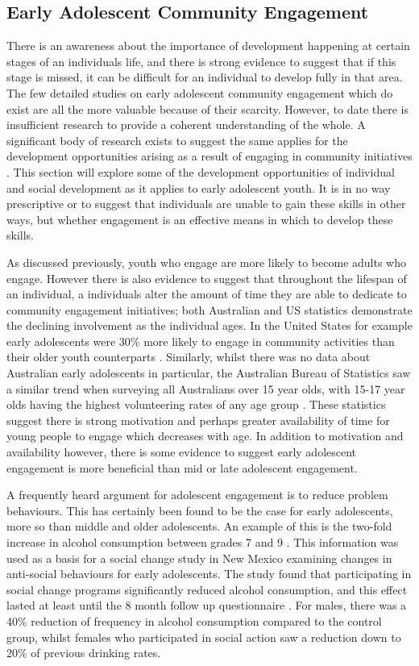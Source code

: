 \subsection{Early Adolescent Community Engagement} 
There is an awareness about the importance of development happening at certain stages of an individuals life, and there is strong evidence to suggest that if this stage is missed, it can be difficult for an individual to develop fully in that area. The few detailed studies on early adolescent community engagement which do exist are all the more valuable because of their scarcity. However, to date there is insufficient research to provide a coherent understanding of the whole. A significant body of research exists to suggest the same applies for the development opportunities arising as a result of engaging in community initiatives \citep[see for example][]{Hart2011}. This section will explore some of the development opportunities of individual and social development as it applies to early adolescent youth. It is in no way prescriptive or to suggest that individuals are unable to gain these skills in other ways, but whether engagement is an effective means in which to develop these skills. 

As discussed previously, youth who engage are more likely to become adults who engage. However there is also evidence to suggest that throughout the lifespan of an individual, a individuals alter the amount of time they are able to dedicate to community engagement initiatives; both Australian and US statistics demonstrate the declining involvement as the individual ages. In the United States for example early adolescents were 30\% more likely to engage in community activities than their older youth counterparts \citep{Spring2006}. Similarly, whilst there was no data about Australian early adolescents in particular, the Australian Bureau of Statistics saw a similar trend when surveying all Australians over 15 year olds, with 15-17 year olds having the highest volunteering rates of any age group \citep{Yates2015}. These statistics suggest there is strong motivation and perhaps greater availability of time for young people to engage which decreases with age. In addition to motivation and availability however, there is some evidence to suggest early adolescent engagement is more beneficial than mid or late adolescent engagement. 

A frequently heard argument for adolescent engagement is to reduce problem behaviours. This has certainly been found to be the case for early adolescents, more so than middle and older adolescents. An example of this is the two-fold increase in alcohol consumption between grades 7 and 9 \citep{Verlande2002}. This information was used as a basis for a social change study in New Mexico examining changes in anti-social behaviours for early adolescents. The study found that participating in social change programs significantly reduced alcohol consumption, and this effect lasted at least until the 8 month follow up questionnaire \citep{Verlande2002}. For males, there was a 40\% reduction of frequency in alcohol consumption compared to the control group, whilst females who participated in social action saw a reduction down to 20\% of previous drinking rates. 

